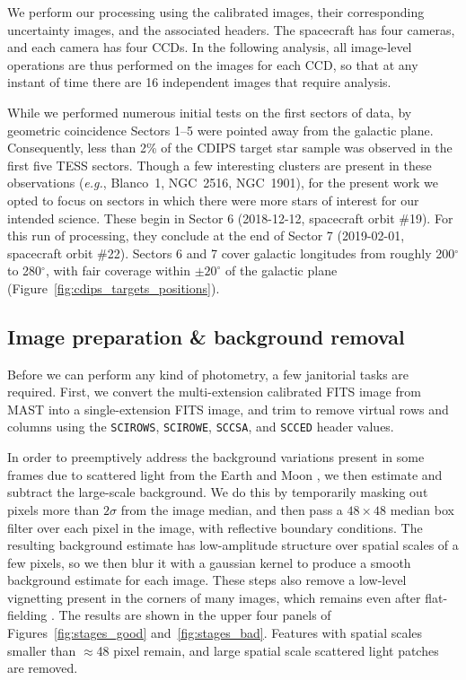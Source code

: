 \documentclass[12pt,twocolumn,tighten]{aastex62}
\begin{document}
We perform our processing using the calibrated images, their
corresponding uncertainty images, and the associated headers.  The
spacecraft has four cameras, and each camera has four CCDs.  In the
following analysis, all image-level operations are thus performed on
the images for each CCD, so that at any instant of time there are 16
independent images that require analysis.

While we performed numerous initial tests on the first sectors of
data, by geometric coincidence Sectors 1--5 were pointed away from the
galactic plane.  Consequently, less than 2\% of the CDIPS target star
sample was observed in the first five TESS sectors.  Though a few
interesting clusters are present in these observations ({\it e.g.},
Blanco~1, NGC~2516, NGC~1901), for the present work we opted to focus
on sectors in which there were more stars of interest for our intended
science.  These begin in Sector 6 (2018-12-12, spacecraft orbit \#19).
For this run of processing, they conclude at the end of Sector 7
(2019-02-01, spacecraft orbit \#22).
Sectors 6 and 7 cover galactic longitudes from roughly 200$^\circ$ to 280$^\circ$, 
with fair coverage within $\pm 20^\circ$ of the galactic plane
(Figure~\ref{fig:cdips_targets_positions}).


\subsection{Image preparation \& background removal}
\label{subsec:preparation}

Before we can perform any kind of photometry, a few janitorial tasks
are required.
First, we convert the multi-extension calibrated FITS image from MAST
into a single-extension FITS image, and trim to remove virtual rows
and columns using the \texttt{SCIROWS}, \texttt{SCIROWE},
\texttt{SCCSA}, and \texttt{SCCED} header values.

In order to preemptively address the background variations present in
some frames due to scattered light from the Earth and Moon
\citep[see][\S 7.3.1--7.3.4]{vanderspek_2018}, we then estimate and
subtract the large-scale background.  We do this by temporarily
masking out pixels more than $2\sigma$ from the image median, and then
pass a $48\times48$ median box filter over each pixel in the image,
with reflective boundary conditions.  The resulting background
estimate has low-amplitude structure over spatial scales of a few
pixels, so we then blur it with a gaussian kernel to produce a smooth
background estimate for each image.  These steps also remove a
low-level vignetting present in the corners of many images, which
remains even after flat-fielding \citep[see][\S
7.3.5]{vanderspek_2018}.  
The results are shown in the upper four panels of Figures~\ref{fig:stages_good}
and~\ref{fig:stages_bad}.
Features with spatial scales smaller than $\approx$48 pixel remain, 
and large spatial scale scattered light patches are removed.
\end{document}
